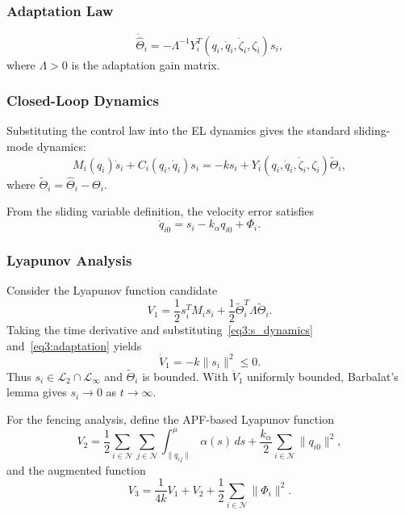 \subsubsection{Adaptation Law}

\begin{equation}\label{eq3:adaptation}
	\dot{\hat{\Theta}}_i = -\Lambda^{-1} Y_i^T(q_i,\dot{q}_i,\dot{\zeta}_i,\zeta_i) s_i,
\end{equation}
where $\Lambda > 0$ is the adaptation gain matrix.

\subsubsection{Closed-Loop Dynamics}

Substituting the control law into the EL dynamics gives the standard sliding-mode dynamics:
\begin{equation}\label{eq3:s_dynamics}
	M_i(q_i)\dot{s}_i + C_i(q_i,\dot{q}_i)s_i = -k s_i + Y_i(q_i,\dot{q}_i,\dot{\zeta}_i,\zeta_i) \tilde{\Theta}_i,
\end{equation}
where $\tilde{\Theta}_i = \hat{\Theta}_i - \Theta_i$.

From the sliding variable definition, the velocity error satisfies
\begin{equation}\label{eq3:vel_rel}
	\dot{q}_{i0} = s_i - k_\alpha q_{i0} + \Phi_i.
\end{equation}

\subsubsection{Lyapunov Analysis}

Consider the Lyapunov function candidate
\begin{equation}\label{eq3:V1}
	V_1 = \frac12 s_i^T M_i s_i + \frac12 \tilde{\Theta}_i^T \Lambda \tilde{\Theta}_i.
\end{equation}
Taking the time derivative and substituting~\eqref{eq3:s_dynamics} and~\eqref{eq3:adaptation} yields
\begin{equation}\label{eq3:V1_dot}
	\dot{V}_1 = -k\|s_i\|^2 \leq 0.
\end{equation}
Thus $s_i \in \mathcal{L}_2 \cap \mathcal{L}_\infty$ and $\tilde{\Theta}_i$ is bounded.
With $\ddot{V}_1$ uniformly bounded, Barbalat's lemma gives $s_i \to 0$ as $t\to\infty$.

For the fencing analysis, define the APF-based Lyapunov function
\begin{equation}\label{eq3:V2}
	V_2 = \frac12 \sum_{i\in\mathcal{N}}\sum_{j\in\mathcal{N}}
	\int_{\|q_{ij}\|}^{\mu} \alpha(s)\,ds
	+ \frac{k_\alpha}{2}\sum_{i\in\mathcal{N}} \|q_{i0}\|^2,
\end{equation}
and the augmented function
\begin{equation}\label{eq3:V3}
	V_3 = \frac{1}{4k}V_1 + V_2 + \frac12 \sum_{i\in\mathcal{N}} \|\Phi_i\|^2.
\end{equation}

